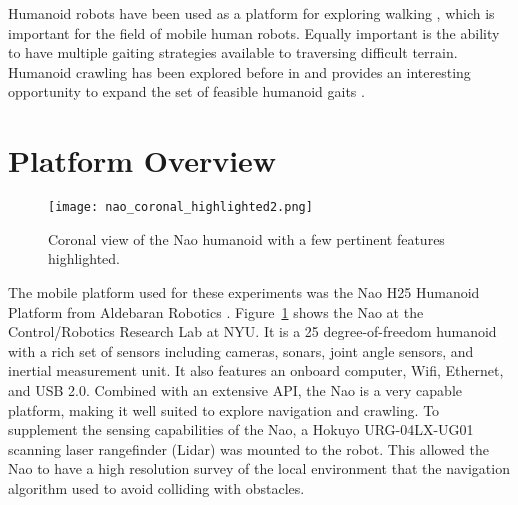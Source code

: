 Humanoid robots have been used as a platform for exploring walking
\cite{Vukobratovic1969, Geijtenbeek2013, Deits2014}, which is important for the
field of mobile human robots. Equally important is the ability to have multiple
gaiting strategies available to traversing difficult terrain.
Humanoid crawling has been explored before in \cite{Li2011, Li_crawlingposture, 
righetti2006} and provides an interesting opportunity to expand the set of
feasible humanoid gaits \cite{Brooks2015}.

\section{Platform Overview}

\begin{figure}
	\centering
	\texttt{[image: nao\_coronal\_highlighted2.png]}
    \caption{Coronal view of the Nao humanoid with a few pertinent features 
             highlighted.}
	\label{fig:nao_diagram1}
\end{figure}

The mobile platform used for these experiments was the Nao H25 Humanoid
Platform from Aldebaran Robotics \cite{nao_docs_h25}. 
Figure~\ref{fig:nao_diagram1} shows the Nao at the Control/Robotics Research
Lab at NYU\@.
It is a 25 degree-of-freedom humanoid with a rich set of sensors
including cameras, sonars, joint angle sensors, and inertial measurement unit. 
It also features an onboard computer, Wifi, Ethernet, and USB 2.0. Combined with 
an extensive API, the Nao is a very capable platform, making it well suited to 
explore navigation and crawling.
To supplement the sensing capabilities of the Nao, a Hokuyo URG-04LX-UG01 
\cite{urg_specs} scanning laser rangefinder (Lidar) was mounted to the robot.
This allowed the Nao to have a high resolution survey of the local environment
that the navigation algorithm used to avoid colliding with obstacles.


